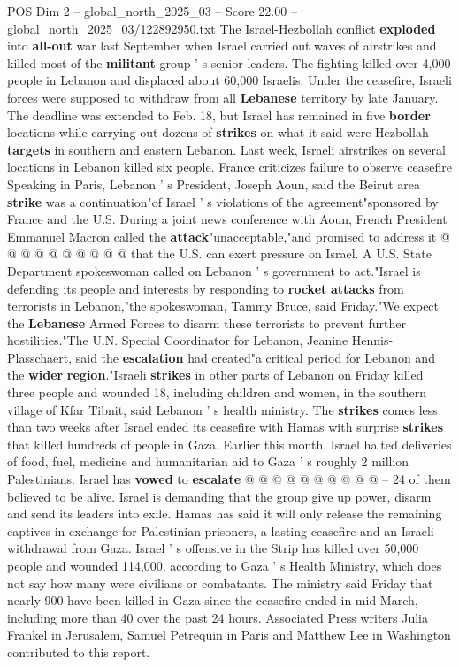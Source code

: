 \begin{textsample}{POS Dim 2 – global\_north\_2025\_03 – Score 22.00 – global\_north\_2025\_03/122892950.txt}
The Israel-Hezbollah conflict \textbf{exploded} into \textbf{all-out} war last September when Israel carried out waves of airstrikes and killed most of the \textbf{militant} group ' s senior leaders.
The fighting killed over 4,000 people in Lebanon and displaced about 60,000 Israelis.
Under the ceasefire, Israeli forces were supposed to withdraw from all \textbf{Lebanese} territory by late January.
The deadline was extended to Feb. 18, but Israel has remained in five \textbf{border} locations while carrying out dozens of \textbf{strikes} on what it said were Hezbollah \textbf{targets} in southern and eastern Lebanon.
Last week, Israeli airstrikes on several locations in Lebanon killed six people.
France criticizes failure to observe ceasefire Speaking in Paris, Lebanon ' s President, Joseph Aoun, said the Beirut area \textbf{strike} was a continuation"of Israel ' s violations of the agreement"sponsored by France and the U.S.
During a joint news conference with Aoun, French President Emmanuel Macron called the \textbf{attack}"unacceptable,"and promised to address it @ @ @ @ @ @ @ @ @ @ that the U.S. can exert pressure on Israel.
A U.S.
State Department spokeswoman called on Lebanon ' s government to act."Israel is defending its people and interests by responding to \textbf{rocket} \textbf{attacks} from terrorists in Lebanon,"the spokeswoman, Tammy Bruce, said Friday."We expect the \textbf{Lebanese} Armed Forces to disarm these terrorists to prevent further hostilities."The U.N.
Special Coordinator for Lebanon, Jeanine Hennis-Plasschaert, said the \textbf{escalation} had created"a critical period for Lebanon and the \textbf{wider} \textbf{region}."Israeli \textbf{strikes} in other parts of Lebanon on Friday killed three people and wounded 18, including children and women, in the southern village of Kfar Tibnit, said Lebanon ' s health ministry.
The \textbf{strikes} comes less than two weeks after Israel ended its ceasefire with Hamas with surprise \textbf{strikes} that killed hundreds of people in Gaza.
Earlier this month, Israel halted deliveries of food, fuel, medicine and humanitarian aid to Gaza ' s roughly 2 million Palestinians.
Israel has \textbf{vowed} to \textbf{escalate} @ @ @ @ @ @ @ @ @ @ -- 24 of them believed to be alive.
Israel is demanding that the group give up power, disarm and send its leaders into exile.
Hamas has said it will only release the remaining captives in exchange for Palestinian prisoners, a lasting ceasefire and an Israeli withdrawal from Gaza.
Israel ' s offensive in the Strip has killed over 50,000 people and wounded 114,000, according to Gaza ' s Health Ministry, which does not say how many were civilians or combatants.
The ministry said Friday that nearly 900 have been killed in Gaza since the ceasefire ended in mid-March, including more than 40 over the past 24 hours.
Associated Press writers Julia Frankel in Jerusalem, Samuel Petrequin in Paris and Matthew Lee in Washington contributed to this report.

\end{textsample}
